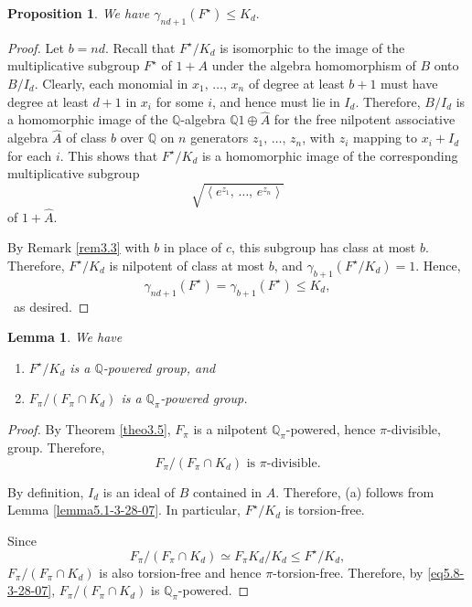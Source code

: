 \documentclass[mathscr]{amsart}
\theoremstyle{theorem}
\newtheorem{lemma}[theorem]{Lemma}
\newtheorem{proposition}[theorem]{Proposition}
\theoremstyle{definition}
\numberwithin{equation}{section}
\def \({\left(}
\def \){\right)}
\begin{document}
\begin{proposition}\label{prop5.4-3-28-07}
We have $\gamma_{nd+1}\(F^\star\)\leq K_d.$
\end{proposition}

\begin{proof}
Let $b=nd$.  Recall that $F^\star/K_d$ is isomorphic to the image of
the multiplicative subgroup $F^\star$ of $1+A$ under the algebra
homomorphism of $B$ onto $B/I_d$.  Clearly, each monomial in
$x_1,\,\dots,\,x_n$ of degree at least $b+1$ must have degree at
least $d+1$ in $x_i$ for some $i$, and hence must lie in $I_d$.
Therefore, $B/I_d$ is a homomorphic image of the
$\mathbb{Q}$-algebra $\mathbb{Q}1\oplus \hat A$ for the free
nilpotent associative algebra $\hat A$ of class $b$ over
$\mathbb{Q}$ on $n$ generators $z_1,\,\dots,\,z_n$, with $z_i$
mapping to $x_i+I_d$ for each $i$.  This shows that $F^\star/K_d$ is
a homomorphic image of the corresponding multiplicative subgroup
$$
\sqrt{\left\langle e^{z_1},\,\dots,\,e^{z_n}\right\rangle}
$$
of $1+\hat A$.

By Remark \ref{rem3.3} with $b$ in place of $c$, this subgroup has
class at most $b$. Therefore, $F^\star/K_d$ is nilpotent of class at
most $b$, and $\gamma_{b+1}\(F^\star/K_d\)=1$.  Hence,
$$
\gamma_{nd+1}\(F^\star\)=\gamma_{b+1}\(F^\star\)\leq K_d,
$$\
as desired.
\end{proof}

\begin{lemma}\label{lemma5.5-3-28-07}
We have
\begin{enumerate}
\item[(a)] $F^\star/K_d$ is a $\mathbb{Q}$-powered group, and
\item[(b)] $F_\pi/\(F_\pi\cap K_d\)$ is a $\mathbb{Q}_\pi$-powered
group.
\end{enumerate}
\end{lemma}

\begin{proof}
By Theorem \ref{theo3.5}, $F_\pi$ is a nilpotent
$\mathbb{Q}_\pi$-powered, hence $\pi$-divisible, group.  Therefore,
\begin{equation}\label{eq5.8-3-28-07}
F_\pi/\(F_\pi\cap K_d\)\text{ is }\pi\text{-divisible.}
\end{equation}

By definition, $I_d$ is an ideal of $B$ contained in $A$. Therefore,
(a) follows from Lemma \ref{lemma5.1-3-28-07}.  In particular,
$F^\star/K_d$ is torsion-free.

Since
$$
F_\pi/\(F_\pi\cap K_d\)\simeq F_\pi K_d/K_d\leq F^\star/K_d,
$$
$F_\pi/\(F_\pi\cap K_d\)$ is also torsion-free and hence
$\pi$-torsion-free.  Therefore, by \eqref{eq5.8-3-28-07},
$F_\pi/\(F_\pi\cap K_d\)$ is $\mathbb{Q}_\pi$-powered.
\end{proof}
\end{document}
